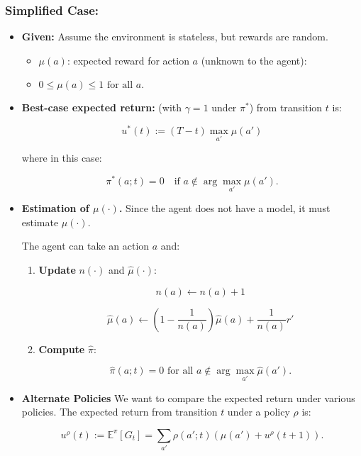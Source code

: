 \subsubsection{Simplified Case:}
\begin{example}
    \begin{itemize}
        \item \textbf{Given:} Assume the environment is stateless, but rewards are random.
        
        \vspace{-1em}
        \begin{itemize}
            \item $\mu(a)$: expected reward for action $a$ (unknown to the agent):
            \item $0 \leq \mu(a) \leq 1 \text{ for all } a.$
        \end{itemize}
        
        \item \textbf{Best-case expected return:} (with $\gamma = 1$ under $\pi^*$) from transition $t$ is:
        
        \[
        u^*(t) := (T - t) \max_{a'} \mu(a')
        \]
        
        where in this case:
        
        \[
        \pi^*(a; t) = 0 \quad \text{if } a \not\in \arg\max_{a'} \mu(a').
        \]
        
        \item \textbf{Estimation of $\mu(\cdot)$.} Since the agent does not have a model, it must estimate $\mu(\cdot)$.
        \vspace{1em}
        
        The agent can take an action $a$ and:
        
        \begin{enumerate}
            \item \textbf{Update} $n(\cdot)$ and $\hat{\mu}(\cdot)$:
        
            \[
            n(a) \leftarrow n(a) + 1
            \]
            
            \[
            \hat{\mu}(a) \leftarrow \left(1 - \frac{1}{n(a)}\right) \hat{\mu}(a) + \frac{1}{n(a)} r'
            \]
            
            \item \textbf{Compute} $\hat{\pi}$:
            
            \[
            \hat{\pi}(a; t) = 0 \text{ for all } a \not\in \arg\max_{a'} \hat{\mu}(a').
            \]
        \end{enumerate}
        \item  \textbf{Alternate Policies} We want to compare the expected return under various policies. The expected return from transition $t$ under a policy $\rho$ is:
        
        \[
        u^{\rho}(t) := \mathbb{E}^{\pi}[G_t] = \sum_{a'} \rho(a'; t) \left(\mu(a') + u^{\rho}(t+1)\right).
        \]
    \end{itemize}
\end{example}
\newpage


